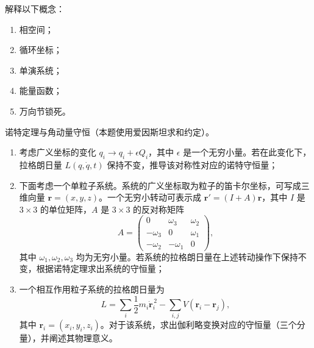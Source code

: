 
\begin{question}[20 分]
解释以下概念：
\begin{enumerate}
  \item 相空间；
  \item 循环坐标；
  \item 单演系统；
  \item 能量函数；
  \item 万向节锁死。
\end{enumerate}

\begin{solution}
\end{solution}
\end{question}

\begin{question}[20 分]
诺特定理与角动量守恒（本题使用爱因斯坦求和约定）。
\begin{enumerate}
  \item 考虑广义坐标的变化 $q_i\to q_i+\epsilon Q_i$，其中 $\epsilon$ 是一个无穷小量。若在此变化下，拉格朗日量 $L(q,\dot q,t)$ 保持不变，推导该对称性对应的诺特守恒量；
  \item 下面考虑一个单粒子系统。系统的广义坐标取为粒子的笛卡尔坐标，可写成三维向量 $\boldsymbol r=(x,y,z)$。一个无穷小转动可表示成 $\boldsymbol r'=(I+A)\boldsymbol r$，其中 $I$ 是 $3\times3$ 的单位矩阵，$A$ 是 $3\times3$ 的反对称矩阵
  \[
    A=
    \begin{pmatrix}
      0&\omega_3&\omega_2\\
      -\omega_3&0&\omega_1\\
      -\omega_2&-\omega_1&0
    \end{pmatrix},
  \]
  其中 $\omega_1,\omega_2,\omega_3$ 均为无穷小量。若系统的拉格朗日量在上述转动操作下保持不变，根据诺特定理求出系统的守恒量；
  \item 一个相互作用粒子系统的拉格朗日量为
  \[
    L=\sum_i\frac12 m_i\dot{\boldsymbol r}_i^{\,2}
    -\sum_{i,j}V\!\left(\boldsymbol r_i-\boldsymbol r_j\right),
  \]
  其中 $\boldsymbol r_i=(x_i,y_i,z_i)$。对于该系统，求出伽利略变换对应的守恒量（三个分量），并阐述其物理意义。
\end{enumerate}

\begin{solution}
\end{solution}
\end{question}

